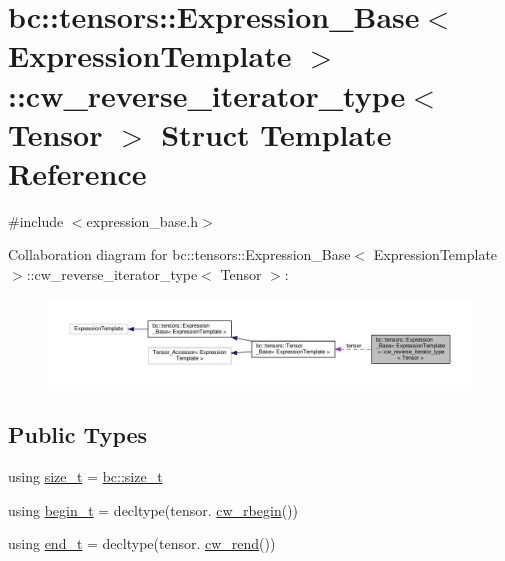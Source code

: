 \hypertarget{structbc_1_1tensors_1_1Expression__Base_1_1cw__reverse__iterator__type}{}\section{bc\+:\+:tensors\+:\+:Expression\+\_\+\+Base$<$ Expression\+Template $>$\+:\+:cw\+\_\+reverse\+\_\+iterator\+\_\+type$<$ Tensor $>$ Struct Template Reference}
\label{structbc_1_1tensors_1_1Expression__Base_1_1cw__reverse__iterator__type}


{\ttfamily \#include $<$expression\+\_\+base.\+h$>$}



Collaboration diagram for bc\+:\+:tensors\+:\+:Expression\+\_\+\+Base$<$ Expression\+Template $>$\+:\+:cw\+\_\+reverse\+\_\+iterator\+\_\+type$<$ Tensor $>$\+:\nopagebreak
\begin{figure}[H]
\begin{center}
\leavevmode
\includegraphics[width=350pt]{structbc_1_1tensors_1_1Expression__Base_1_1cw__reverse__iterator__type__coll__graph}
\end{center}
\end{figure}
\subsection*{Public Types}
\begin{DoxyCompactItemize}
\item 
using \hyperlink{structbc_1_1tensors_1_1Expression__Base_1_1cw__reverse__iterator__type_a0d2537ccece5626aeb1feef58980f3b6}{size\+\_\+t} = \hyperlink{namespacebc_aaf8e3fbf99b04b1b57c4f80c6f55d3c5}{bc\+::size\+\_\+t}
\item 
using \hyperlink{structbc_1_1tensors_1_1Expression__Base_1_1cw__reverse__iterator__type_a63231d68ab487d4d24996e7a538fc427}{begin\+\_\+t} = decltype(tensor. \hyperlink{classbc_1_1tensors_1_1Expression__Base_a82c194b3f8c9e934caf0ac5e5380042a}{cw\+\_\+rbegin}())
\item 
using \hyperlink{structbc_1_1tensors_1_1Expression__Base_1_1cw__reverse__iterator__type_aff1a4ff5ef38cc11c629243ef23d6155}{end\+\_\+t} = decltype(tensor. \hyperlink{classbc_1_1tensors_1_1Expression__Base_acd8f45445f2245cf879680274cc89d7f}{cw\+\_\+rend}())
\end{DoxyCompactItemize}
